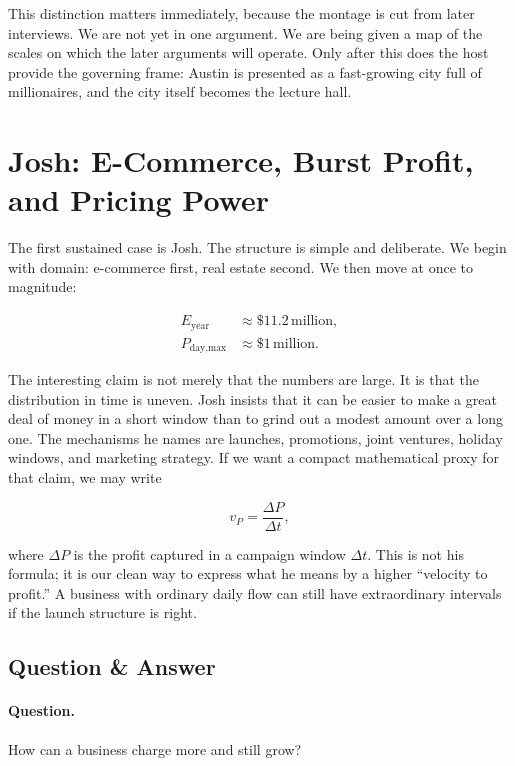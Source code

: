 This distinction matters immediately, because the montage is cut from later interviews. We are not yet in one argument. We are being given a map of the scales on which the later arguments will operate. Only after this does the host provide the governing frame: Austin is presented as a fast-growing city full of millionaires, and the city itself becomes the lecture hall.

\section{Josh: E-Commerce, Burst Profit, and Pricing Power}

The first sustained case is Josh. The structure is simple and deliberate. We begin with domain: e-commerce first, real estate second. We then move at once to magnitude:

\begin{align}
E_{\text{year}} &\approx \$11.2\,\text{million},\\
P_{\text{day,max}} &\approx \$1\,\text{million}.
\end{align}

The interesting claim is not merely that the numbers are large. It is that the distribution in time is uneven. Josh insists that it can be easier to make a great deal of money in a short window than to grind out a modest amount over a long one. The mechanisms he names are launches, promotions, joint ventures, holiday windows, and marketing strategy. If we want a compact mathematical proxy for that claim, we may write

\begin{equation}
v_P = \frac{\Delta P}{\Delta t},
\end{equation}

where $\Delta P$ is the profit captured in a campaign window $\Delta t$. This is not his formula; it is our clean way to express what he means by a higher ``velocity to profit.'' A business with ordinary daily flow can still have extraordinary intervals if the launch structure is right.

\subsection{Question \& Answer}

\paragraph{Question.} How can a business charge more and still grow?

